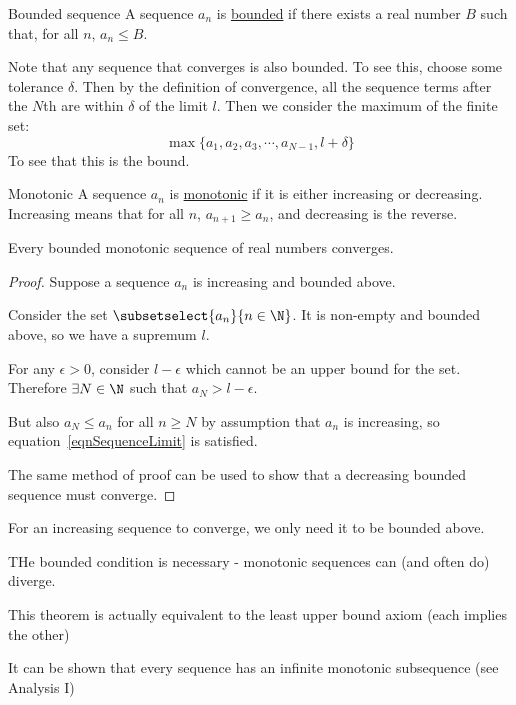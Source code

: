 \documentclass[../Main.tex]{subfiles}
\begin{document}
\begin{definition}{Bounded sequence}
    A sequence $a_n$ is \underline{bounded} if there exists a real number $B$ such that, for all $n$, $a_n \leq B$.
\end{definition}
Note that any sequence that converges is also bounded. To see this, choose some tolerance $\delta$. Then by the definition of convergence, all the sequence terms after the $N$th are within $\delta$ of the limit $l$. Then we consider the maximum of the finite set:
\begin{equation*}
    \max{\{a_1, a_2, a_3, \cdots, a_{N-1}, l + \delta\}}
\end{equation*}
To see that this is the bound.
\begin{definition}{Monotonic}
    A sequence $a_n$ is \underline{monotonic} if it is either increasing or decreasing. Increasing means that for all $n$, $a_{n+1} \geq a_n$, and decreasing is the reverse.
\end{definition}
\begin{theorem}
    Every bounded monotonic sequence of real numbers converges.
\end{theorem}
\begin{proof}
    Suppose a sequence $a_n$ is increasing and bounded above.\par
    Consider the set $\subsetselect{a_n}{n \in \N}$. It is non-empty and bounded above, so we have a supremum $l$.\par
    For any $\epsilon > 0$, consider $l - \epsilon$ which cannot be an upper bound for the set. Therefore $\exists N \in \N$ such that $a_N > l - \epsilon$.\par
    But also $a_N \leq a_n$ for all $n \geq N$ by assumption that $a_n$ is increasing, so equation~\ref{eqnSequenceLimit} is satisfied.\par
    The same method of proof can be used to show that a decreasing bounded sequence must converge.
\end{proof}
\begin{remarks}
    \item For an increasing sequence to converge, we only need it to be bounded above.
    \item THe bounded condition is necessary - monotonic sequences can (and often do) diverge.
    \item This theorem is actually equivalent to the least upper bound axiom (each implies the other)
    \item It can be shown that every sequence has an infinite monotonic subsequence (see Analysis I)
\end{remarks}
\end{document}
